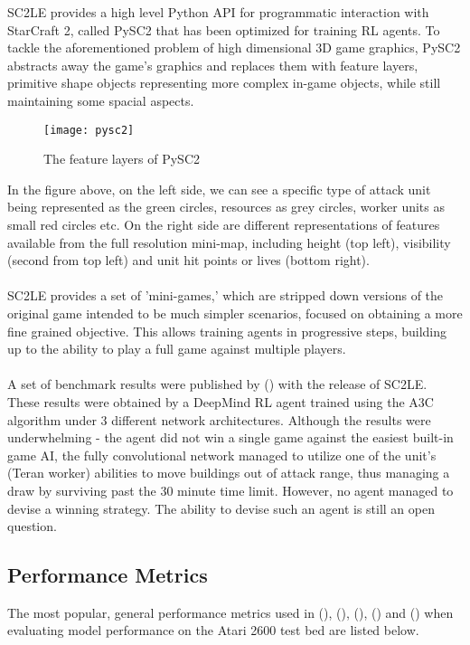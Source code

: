 SC2LE provides a high level Python API for programmatic interaction with StarCraft 2, called PySC2 that has been optimized for training RL agents. To tackle the aforementioned problem of high dimensional 3D game graphics, PySC2 abstracts away the game's graphics and replaces them with feature layers, primitive shape objects representing more complex in-game objects, while still maintaining some spacial aspects.

\begin{figure}[H]
    \centering
    \texttt{[image: pysc2]}
    \caption{The feature layers of PySC2}
\end{figure}

In the figure above, on the left side, we can see a specific type of attack unit being represented as the green circles, resources as grey circles, worker units as small red circles etc. On the right side are different representations of features available from the full resolution mini-map, including height (top left), visibility (second from top left) and unit hit points or lives (bottom right). \paragraph{}

SC2LE provides a set of 'mini-games,' which are stripped down versions of the original game intended to be much simpler scenarios, focused on obtaining a more fine grained objective. This allows training agents in progressive steps, building up to the ability to play a full game against multiple players. \paragraph{}

A set of benchmark results were published by (\cite{starcraft}) with the release of SC2LE. These results were obtained by a DeepMind RL agent trained using the A3C algorithm under 3 different network architectures. Although the results were underwhelming - the agent did not win a single game against the easiest built-in game AI, the fully convolutional network managed to utilize one of the unit's (Teran worker) abilities to move buildings out of attack range, thus managing a draw by surviving past the 30 minute time limit. However, no agent managed to devise a winning strategy. The ability to devise such an agent is still an open question.

\subsection{Performance Metrics}
The most popular, general performance metrics used in (\cite{deepmind1}), (\cite{doubleq}), (\cite{dueling}), (\cite{human}) and (\cite{a3c}) when evaluating model performance on the Atari 2600 test bed are listed below.

